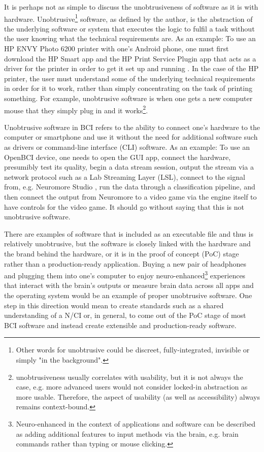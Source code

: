 It is perhaps not as simple to discuss the unobtrusiveness of software as it is with hardware. Unobtrusive\footnote{Other words for unobtrusive could be discreet, fully-integrated, invisible or simply "in the background".} software, as defined by the author, is the abstraction of the underlying software or system that executes the logic to fulfil a task without the user knowing what the technical requirements are. As an example: To use an HP ENVY Photo 6200 printer with one's Android phone, one must first download the HP Smart app and the HP Print Service Plugin app that acts as a driver for the printer in order to get it set up and running \citep{hp_hp_nodate}. In the case of the HP printer, the user must understand some of the underlying technical requirements in order for it to work, rather than simply concentrating on the task of printing something. For example, unobtrusive software is when one gets a new computer mouse that they simply plug in and it works\footnote{unobtrusiveness usually correlates with usability, but it is not always the case, e.g. more advanced users would not consider locked-in abstraction as more usable. Therefore, the aspect of usability (as well as accessibility) always remains context-bound.}.

Unobtrusive software in BCI refers to the ability to connect one's hardware to the computer or smartphone and use it without the need for additional software such as drivers or command-line interface (CLI) software. As an example: To use an OpenBCI device, one needs to open the GUI app, connect the hardware, presumibly test its quality, begin a data stream session, output the stream via a network protocol such as a Lab Streaming Layer (LSL), connect to the signal from, e.g. Neuromore Studio \citep{openbci_neuromore_nodate}, run the data through a classification pipeline, and then connect the output from Neuromore to a video game via the engine itself to have controls for the video game. It should go without saying that this is not unobtrusive software.

There are examples of software that is included as an executable file and thus is relatively unobtrusive, but the software is closely linked with the hardware and the brand behind the hardware, or it is in the proof of concept (PoC) stage rather than a production-ready application. Buying a new pair of headphones and plugging them into one's computer to enjoy neuro-enhanced\footnote{Neuro-enhanced in the context of applications and software can be described as adding additional features to input methods via the brain, e.g. brain commands rather than typing or mouse clicking.} experiences that interact with the brain's outputs or measure brain data across all apps and the operating system would be an example of proper unobtrusive software. One step in this direction would mean to create standards such as a shared understanding of a N/CI or, in general, to come out of the PoC stage of most BCI software and instead create extensible and production-ready software.

